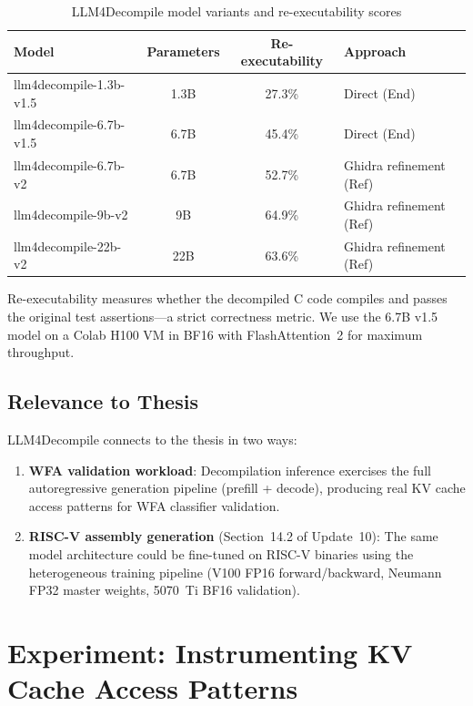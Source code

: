 \documentclass[11pt,letterpaper]{article}
\begin{document}
\begin{table}[htbp]
\centering
\caption{LLM4Decompile model variants and re-executability scores}
\label{tab:llm4decompile-models}
\begin{tabular}{@{}lccl@{}}
\toprule
\textbf{Model} & \textbf{Parameters} & \textbf{Re-executability} & \textbf{Approach} \\
\midrule
llm4decompile-1.3b-v1.5 & 1.3B & 27.3\% & Direct (End) \\
llm4decompile-6.7b-v1.5 & 6.7B & 45.4\% & Direct (End) \\
llm4decompile-6.7b-v2 & 6.7B & 52.7\% & Ghidra refinement (Ref) \\
llm4decompile-9b-v2 & 9B & 64.9\% & Ghidra refinement (Ref) \\
llm4decompile-22b-v2 & 22B & 63.6\% & Ghidra refinement (Ref) \\
\bottomrule
\end{tabular}
\end{table}

Re-executability measures whether the decompiled C code compiles and passes the original test assertions---a strict correctness metric. We use the 6.7B v1.5 model on a Colab H100 VM in BF16 with FlashAttention~2 for maximum throughput.

\subsection{Relevance to Thesis}

LLM4Decompile connects to the thesis in two ways:

\begin{enumerate}
    \item \textbf{WFA validation workload}: Decompilation inference exercises the full autoregressive generation pipeline (prefill + decode), producing real KV cache access patterns for WFA classifier validation.
    \item \textbf{RISC-V assembly generation} (Section~14.2 of Update~10): The same model architecture could be fine-tuned on RISC-V binaries using the heterogeneous training pipeline (V100 FP16 forward/backward, Neumann FP32 master weights, 5070~Ti BF16 validation).
\end{enumerate}

\section{Experiment: Instrumenting KV Cache Access Patterns}
\label{sec:experiment}
\end{document}
